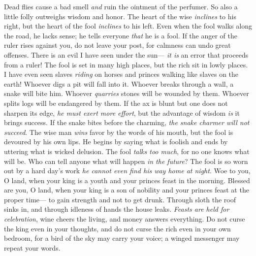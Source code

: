 \begin{biblechapter} %
\verse Dead flies cause a bad smell \textit{and} ruin the ointment of the perfumer. 
So also a little folly outweighs wisdom and honor.
\verse The heart of the wise \textit{inclines} to his right, 
but the heart of the fool \textit{inclines} to his left.
\verse Even when the fool walks along the road, he lacks sense; 
he tells everyone \textit{that} he is a fool.
\verse If the anger of the ruler rises against you, 
do not leave your post, 
for calmness can undo great offenses.
\verse There is an evil I have seen under the sun— 
\textit{it is} an error that proceeds from a ruler!
\verse The fool is set in many high places, 
but the rich sit in lowly places.
\verse I have even seen slaves \textit{riding} on horses 
and princes walking like slaves on the earth!
 Whoever digs a pit will fall into it. 
Whoever breaks through a wall, a snake will bite him.
\verse Whoever \textit{quarries} stones will be wounded by them. 
Whoever splits logs will be endangered by them.
 If the ax is blunt but one does not sharpen its edge, 
\textit{he must exert more effort}, 
but the advantage of wisdom \textit{is} it brings success.
\verse If the snake bites before the charming, 
\textit{the snake charmer will not succeed}.
 The wise man \textit{wins} favor by the words of his mouth, 
but the fool is devoured by his own lips.
\verse He begins by saying what is foolish 
and ends by uttering what is wicked delusion.
\verse The fool \textit{talks too much}, 
for no one knows what will be. 
Who can tell anyone what will happen \textit{in the future}?
\verse The fool is so worn out by a hard day’s work 
\textit{he cannot even find his way home at night}.
\verse Woe to you, O land, when your king is a youth 
and your princes feast in the morning.
\verse Blessed are you, O land, when your king is a son of nobility 
and your princes feast at the proper time— 
to gain strength and not to get drunk.
\verse Through sloth the roof sinks in, 
and through idleness of hands the house leaks.
\verse \textit{Feasts are held for celebration}, 
wine cheers the living, 
and money answers everything.
\verse Do not curse the king even in your thoughts, 
and do not curse the rich even in your own bedroom, 
for a bird of the sky may carry your voice; 
a winged messenger may repeat your words.
\end{biblechapter}

